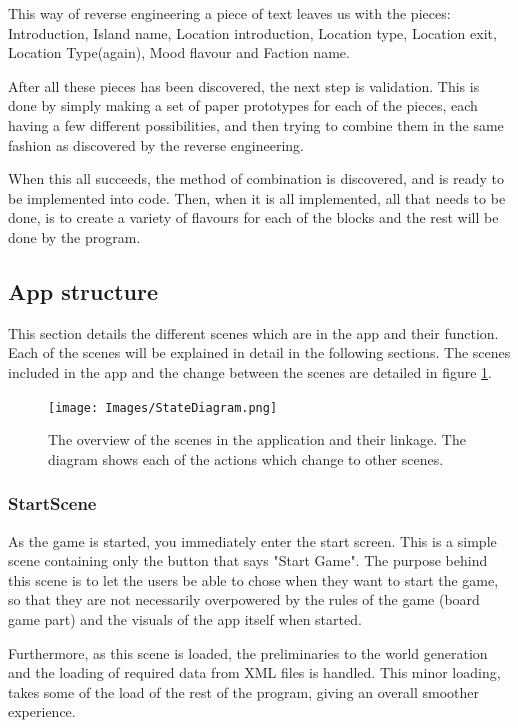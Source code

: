 This way of reverse engineering a piece of text leaves us with the pieces: Introduction, Island name, Location introduction, Location type, Location exit, Location Type(again), Mood flavour and Faction name.

After all these pieces has been discovered, the next step is validation. This is done by simply making a set of paper prototypes for each of the pieces, each having a few different possibilities, and then trying to combine them in the same fashion as discovered by the reverse engineering. 

When this all succeeds, the method of combination is discovered, and is ready to be implemented into code. Then, when it is all implemented, all that needs to be done, is to create a variety of flavours for each of the blocks and the rest will be done by the program.

\subsection{App structure}
This section details the different scenes which are in the app and their function. 
Each of the scenes will be explained in detail in the following sections.
The scenes included in the app and the change between the scenes are detailed in figure \ref{fig:appState}.

\begin{figure}[h]
    \centering
    \texttt{[image: Images/StateDiagram.png]}
    \caption{The overview of the scenes in the application and their linkage. The diagram shows each of the actions which change to other scenes.}
    \label{fig:appState}
\end{figure}

\subsubsection{StartScene}
As the game is started, you immediately enter the start screen. This is a simple scene containing only the button that says "Start Game". The purpose behind this scene is to let the users be able to chose when they want to start the game, so that they are not necessarily overpowered by the rules of the game (board game part) and the visuals of the app itself when started.

Furthermore, as this scene is loaded, the preliminaries to the world generation and the loading of required data from XML files is handled. This minor loading, takes some of the load of the rest of the program, giving an overall smoother experience.

